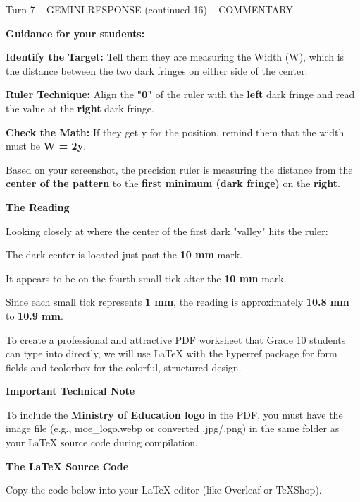 \documentclass[10pt,a4paper]{article}
\begin{document}
\begin{aibox}{Turn 7 -- GEMINI RESPONSE (continued 16) -- COMMENTARY}

\textbf{\large Guidance for your students:}

\textbf{Identify the Target:} Tell them they are measuring the Width (W), which is the distance between the two dark fringes on either side of the center.

\textbf{Ruler Technique:} Align the \textbf{"0"} of the ruler with the \textbf{left} dark fringe and read the value at the \textbf{right} dark fringe.

\textbf{Check the Math:} If they get y for the position, remind them that the width must be \textbf{W = 2y}.

Based on your screenshot, the precision ruler is measuring the distance from the \textbf{center of the pattern} to the \textbf{first minimum (dark fringe)} on the \textbf{right}.

\textbf{\large The Reading}

Looking closely at where the center of the first dark "valley" hits the ruler:

The dark center is located just past the \textbf{10 mm} mark.

It appears to be on the fourth small tick after the \textbf{10 mm} mark.

Since each small tick represents \textbf{1 mm}, the reading is approximately \textbf{10.8 mm} to \textbf{10.9 mm}.

To create a professional and attractive PDF worksheet that Grade 10 students can type into directly, we will use LaTeX with the hyperref package for form fields and tcolorbox for the colorful, structured design.

\textbf{\large Important Technical Note}

To include the \textbf{Ministry of Education logo} in the PDF, you must have the image file (e.g., moe\_logo.webp or converted .jpg/.png) in the same folder as your LaTeX source code during compilation.

\textbf{\large The LaTeX Source Code}

Copy the code below into your LaTeX editor (like Overleaf or TeXShop).

\end{aibox}
\end{document}
